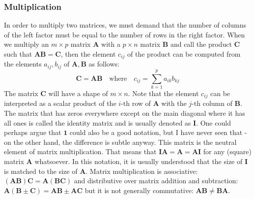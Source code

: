 \subsubsection{Multiplication} In order to multiply two matrices, we must demand that the number of columns of the left factor must be equal to the number of rows in the right factor. When we multiply an $m \times p$ matrix $\mathbf{A}$ with a $p \times n$ matrix $\mathbf{B}$ and call the product $\mathbf{C}$ such that $\mathbf{A} \mathbf{B} = \mathbf{C}$, then the element $c_{ij}$ of the product can be computed from the elements $a_{ij}, b_{ij}$ of $\mathbf{A}, \mathbf{B}$ as follows:
\begin{equation}
 \mathbf{C} = \mathbf{A} \mathbf{B} 
 \quad \text{where} \quad
 c_{ij} = \sum_{k=1}^p a_{ik} b_{kj}
\end{equation}
The matrix $\mathbf{C}$ will have a shape of $m \times n$. Note that the element $c_{ij}$ can be interpreted as a scalar product of the $i$-th row of $\mathbf{A}$ with the $j$-th column of  $\mathbf{B}$. The matrix that has zeros everywhere except on the main diagonal where it has all ones is called the identity matrix and is usually denoted as $\mathbf{I}$. One could perhaps argue that $\mathbf{1}$ could also be a good notation, but I have never seen that - on the other hand, the difference is subtle anyway. This matrix is the neutral element of matrix multiplication. That means that  $\mathbf{I} \mathbf{A} = \mathbf{A} = \mathbf{A} \mathbf{I}$ for any (square) matrix $\mathbf{A}$ whatsoever. In this notation, it is usually understood that the size of $\mathbf{I}$ is matched to the size of $\mathbf{A}$. Matrix multiplication is associative: $(\mathbf{A} \mathbf{B}) \mathbf{C} = \mathbf{A} (\mathbf{B} \mathbf{C})$ and distributive over matrix addition and subtraction: $\mathbf{A} (\mathbf{B} \pm \mathbf{C}) = \mathbf{A} \mathbf{B} \pm \mathbf{A} \mathbf{C}$ but it is not generally commutative: $\mathbf{AB} \neq \mathbf{BA}$. 



